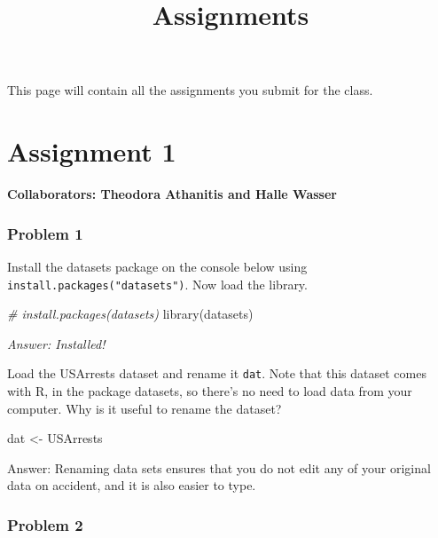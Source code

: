 \documentclass[
]{article}
\title{Assignments}
\author{}
\date{\vspace{-2.5em}}
\newenvironment{Shaded}{\begin{snugshade}}{\end{snugshade}}
\newcommand{\CommentTok}[1]{\textcolor[rgb]{0.56,0.35,0.01}{\textit{#1}}}
\newcommand{\FunctionTok}[1]{\textcolor[rgb]{0.00,0.00,0.00}{#1}}
\newcommand{\NormalTok}[1]{#1}
\newcommand{\OtherTok}[1]{\textcolor[rgb]{0.56,0.35,0.01}{#1}}
\begin{document}
\maketitle

This page will contain all the assignments you submit for the class.

\hypertarget{assignment-1}{%
\section{Assignment 1}\label{assignment-1}}

\textbf{Collaborators: Theodora Athanitis and Halle Wasser }

\hypertarget{problem-1}{%
\subsubsection{Problem 1}\label{problem-1}}

Install the datasets package on the console below using
\texttt{install.packages("datasets")}. Now load the library.

\begin{Shaded}
\begin{Highlighting}[]
\CommentTok{\# install.packages(\textquotesingle{}datasets\textquotesingle{})}
\FunctionTok{library}\NormalTok{(datasets)}
\end{Highlighting}
\end{Shaded}

\emph{Answer: Installed!}

Load the USArrests dataset and rename it \texttt{dat}. Note that this
dataset comes with R, in the package datasets, so there's no need to
load data from your computer. Why is it useful to rename the dataset?

\begin{Shaded}
\begin{Highlighting}[]
\NormalTok{dat }\OtherTok{\textless{}{-}}\NormalTok{ USArrests}
\end{Highlighting}
\end{Shaded}

Answer: Renaming data sets ensures that you do not edit any of your
original data on accident, and it is also easier to type.

\hypertarget{problem-2}{%
\subsubsection{Problem 2}\label{problem-2}}
\end{document}
